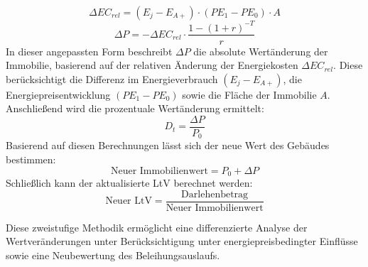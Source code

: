 \begin{equation}
    \Delta EC_{rel} = (E_j - E_{A+}) \cdot (PE_1 - PE_0) \cdot A
    \end{equation}
    \begin{equation}
    \Delta P = -\Delta EC_{rel} \cdot \frac{1 - (1 + r)^{-T}}{r}
    \end{equation}
    In dieser angepassten Form beschreibt $\Delta P$ die absolute Wertänderung der Immobilie, basierend auf der relativen Änderung der Energiekosten $\Delta EC_{rel}$. Diese berücksichtigt die Differenz im Energieverbrauch $(E_j - E_{A+})$, die Energiepreisentwicklung $(PE_1 - PE_0)$ sowie die Fläche der Immobilie $A$.
    Anschließend wird die prozentuale Wertänderung ermittelt:
    \begin{equation}
    D_t = \frac{\Delta P}{P_0}
    \end{equation}
    Basierend auf diesen Berechnungen lässt sich der neue Wert des Gebäudes bestimmen:
    \begin{equation}
    \text{Neuer Immobilienwert} = P_0 + \Delta P
    \end{equation}
    Schließlich kann der aktualisierte \ac{LtV} berechnet werden:
    \begin{equation}
    \text{Neuer LtV} = \frac{\text{Darlehenbetrag}}{\text{Neuer Immobilienwert}}
    \end{equation}

Diese zweistufige Methodik ermöglicht eine differenzierte Analyse der Wertveränderungen unter Berücksichtigung unter energiepreisbedingter Einflüsse sowie eine Neubewertung des Beleihungsauslaufs.